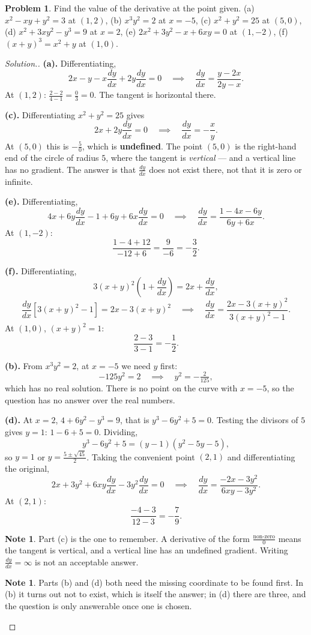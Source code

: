 \documentclass[11pt,a4paper]{article}
\theoremstyle{definition}
\newtheorem{note}[thm]{Note}
\newtheorem{problemx}{Problem}[section]
\newenvironment{problem}{\begin{problemx}}{\end{problemx}}
\newenvironment{solution}
  {\renewcommand{\qedsymbol}{}\begin{proof}[\textit{Solution}.]}
  {\end{proof}}
\begin{document}
\begin{problem}
Find the value of the derivative at the point given.
\quad (a) $x^2-xy+y^2=3$ at $(1,2)$, \quad (b) $x^3y^2=2$ at $x=-5$, \quad
(c) $x^2+y^2=25$ at $(5,0)$, \quad (d) $x^2+3xy^2-y^3=9$ at $x=2$, \quad
(e) $2x^2+3y^2-x+6xy=0$ at $(1,-2)$, \quad (f) $(x+y)^3=x^2+y$ at $(1,0)$.
\end{problem}

\begin{solution}
\textbf{(a).} Differentiating,
$$2x-y-x\frac{dy}{dx}+2y\frac{dy}{dx}=0\quad\implies\quad
\frac{dy}{dx}=\frac{y-2x}{2y-x}.$$
At $(1,2)$: $\frac{2-2}{4-1}=\frac{0}{3}=0$. The tangent is horizontal there.

\textbf{(c).} Differentiating $x^2+y^2=25$ gives
$$2x+2y\frac{dy}{dx}=0\quad\implies\quad \frac{dy}{dx}=-\frac{x}{y}.$$
At $(5,0)$ this is $-\frac{5}{0}$, which is \textbf{undefined}. The point $(5,0)$ is
the right-hand end of the circle of radius $5$, where the tangent is \emph{vertical} ---
and a vertical line has no gradient. The answer is that $\frac{dy}{dx}$ does not exist
there, not that it is zero or infinite.

\textbf{(e).} Differentiating,
$$4x+6y\frac{dy}{dx}-1+6y+6x\frac{dy}{dx}=0\quad\implies\quad
\frac{dy}{dx}=\frac{1-4x-6y}{6y+6x}.$$
At $(1,-2)$:
$$\frac{1-4+12}{-12+6}=\frac{9}{-6}=-\frac{3}{2}.$$

\textbf{(f).} Differentiating,
$$3(x+y)^2\left(1+\frac{dy}{dx}\right)=2x+\frac{dy}{dx},$$
$$\frac{dy}{dx}\left[3(x+y)^2-1\right]=2x-3(x+y)^2\quad\implies\quad
\frac{dy}{dx}=\frac{2x-3(x+y)^2}{3(x+y)^2-1}.$$
At $(1,0)$, $(x+y)^2=1$:
$$\frac{2-3}{3-1}=-\frac{1}{2}.$$

\textbf{(b).} From $x^3y^2=2$, at $x=-5$ we need $y$ first:
$$-125y^2=2\quad\implies\quad y^2=-\tfrac{2}{125},$$
which has no real solution. There is no point on the curve with $x=-5$, so the question
has no answer over the real numbers.

\textbf{(d).} At $x=2$, $4+6y^2-y^3=9$, that is $y^3-6y^2+5=0$. Testing the divisors of
$5$ gives $y=1$: $1-6+5=0$. Dividing,
$$y^3-6y^2+5=(y-1)\left(y^2-5y-5\right),$$
so $y=1$ or $y=\frac{5\pm\sqrt{45}}{2}$. Taking the convenient point $(2,1)$ and
differentiating the original,
$$2x+3y^2+6xy\frac{dy}{dx}-3y^2\frac{dy}{dx}=0\quad\implies\quad
\frac{dy}{dx}=\frac{-2x-3y^2}{6xy-3y^2}.$$
At $(2,1)$:
$$\frac{-4-3}{12-3}=-\frac{7}{9}.$$

\begin{note}
Part (c) is the one to remember. A derivative of the form $\frac{\text{non-zero}}{0}$
means the tangent is vertical, and a vertical line has an undefined gradient. Writing
$\frac{dy}{dx}=\infty$ is not an acceptable answer.
\end{note}

\begin{note}
Parts (b) and (d) both need the missing coordinate to be found first. In (b) it turns
out not to exist, which is itself the answer; in (d) there are three, and the question
is only answerable once one is chosen.
\end{note}
\end{solution}
\end{document}
